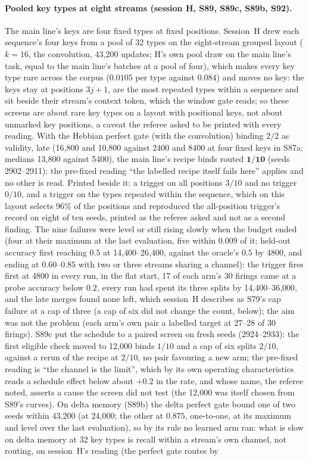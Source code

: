 \documentclass[11pt]{article}
\begin{document}
\paragraph{Pooled key types at eight streams (session H, S89, S89c, S89b, S92).} The main line's keys are four fixed types at fixed positions. Session~H drew each sequence's four keys from a pool of 32 types on the eight-stream grouped layout ($k = 16$, the convolution, 43{,}200 updates; H's own pool draw on the main line's task, equal to the main line's batches at a pool of four), which makes every key type rare across the corpus ($0.0105$ per type against $0.084$) and moves no key: the keys stay at positions $3j + 1$, are the most repeated types within a sequence and sit beside their stream's context token, which the window gate reads; so these screens are about rare key types on a layout with positional keys, not about unmarked key positions, a caveat the referee asked to be printed with every reading. With the Hebbian perfect gate (with the convolution) binding $2/2$ as validity, late (16{,}800 and 10{,}800 against 2400 and 8400 at four fixed keys in S87a; medians 13{,}800 against 5400), the main line's recipe binds routed $\mathbf{1/10}$ (seeds 2902--2911): the pre-fixed reading ``the labelled recipe itself fails here'' applies and no other is read. Printed beside it: a trigger on all positions $3/10$ and no trigger $0/10$, and a trigger on the types repeated within the sequence, which on this layout selects 96\% of the positions and reproduced the all-position trigger's record on eight of ten seeds, printed as the referee asked and not as a second finding. The nine failures were level or still rising slowly when the budget ended (four at their maximum at the last evaluation, five within $0.009$ of it; held-out accuracy first reaching $0.5$ at 14{,}400--26{,}400, against the oracle's $0.5$ by 4800, and ending at $0.60$--$0.85$ with two or three streams sharing a channel): the trigger fires first at 4800 in every run, in the flat start, 17 of each arm's 30 firings came at a probe accuracy below $0.2$, every run had spent its three splits by 14{,}400--36{,}000, and the late merges found none left, which session~H describes as S79's cap failure at a cap of three (a cap of six did not change the count, below); the aim was not the problem (each arm's own pair a labelled target at 27--28 of 30 firings). S89c put the schedule to a paired screen on fresh seeds (2924--2933): the first eligible check moved to 12{,}000 binds $1/10$ and a cap of six splits $2/10$, against a rerun of the recipe at $2/10$, no pair favouring a new arm; the pre-fixed reading is ``the channel is the limit'', which by its own operating characteristics reads a schedule effect below about $+0.2$ in the rate, and whose name, the referee noted, asserts a cause the screen did not test (the 12{,}000 was itself chosen from S89's curves). On delta memory (S89b) the delta perfect gate bound one of two seeds within 43{,}200 (at 24{,}000; the other at $0.875$, one-to-one, at its maximum and level over the last evaluation), so by its rule no learned arm ran: what is slow on delta memory at 32 key types is recall within a stream's own channel, not routing, on session~H's reading (the perfect gate routes by 
\end{document}

